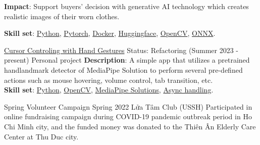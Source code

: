 \documentclass{src/preamble/doc_class}
\begin{document}
\begin{MainPart}
{			\textbf{Impact}: Support buyers' decision with generative AI technology which creates realistic images of their worn clothes.
			\vspace{.15cm}
			
			\textbf{Skill set}: \href{https://www.python.org/}{Python}, \href{https://pytorch.org/}{Pytorch}, \href{https://www.docker.com/}{Docker}, \href{https://huggingface.co/}{Huggingface}, \href{https://opencv.org/}{OpenCV}, \href{https://onnx.ai/}{ONNX}.
		}
		\end{MainPart}
		\newpage        

	\begin{SecondaryMainBar}{\ColorBackground}{\ColorTextSide}
	\end{SecondaryMainBar}
	
	\begin{SecondaryMainPart}
		\Experience
  		{\ColorHighlight}
  		{\href{https://github.com/diligent-man/Cursor-controlling-with-hand-gestures/tree/main}{Cursor Controling with Hand Gestures}}
  		{Status: Refactoring (Summer 2023 - present)}
  		{Personal project}
  		{
			\textbf{Description}: A simple app that utilizes a pretrained handlandmark detector of MediaPipe Solution to perform several pre-defined actions such as mouse hovering, volume control, tab transition, etc.\\
			
			\vspace{.15cm}
			\textbf{Skill set}: \href{https://www.python.org/}{Python}, \href{https://opencv.org/}{OpenCV}, \href{https://ai.google.dev/edge/mediapipe/solutions/guide}{MediaPipe Solutions}, \href{https://docs.python.org/3/library/asyncio.html}{Async handling}.
		}
		\vspace{.35cm}
		
		\Experience
		{\ColorHighlight}
		{Spring Volunteer Campaign}
		{Spring 2022}
		{Lửa Tâm Club (USSH)}
		{
			Participated in online fundraising campaign during COVID-19 pandemic outbreak period in Ho Chi Minh city, and the funded money was donated to the Thiên Ân Elderly Care Center at Thu Duc city.
		}		
	\end{SecondaryMainPart}
\end{document}
